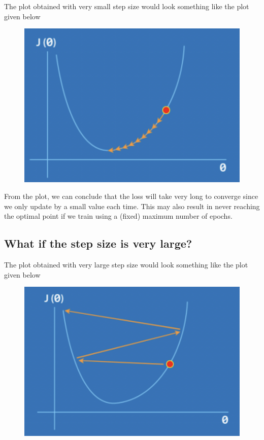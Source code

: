 The plot obtained with very small step size would look something like the plot given below
\begin{figure}[H]
  \includegraphics[scale=0.3]{images/11.png}
  \centering
\end{figure}

From the plot, we can conclude that the loss will take very long to converge since we only update by a small value each time. This may also result in never reaching the optimal point if we train using a (fixed) maximum number of epochs.

\subsection{What if the step size is very large?}

The plot obtained with very large step size would look something like the plot given below
\begin{figure}[H]
  \includegraphics[scale=0.3]{images/12.png}
  \centering
\end{figure}

